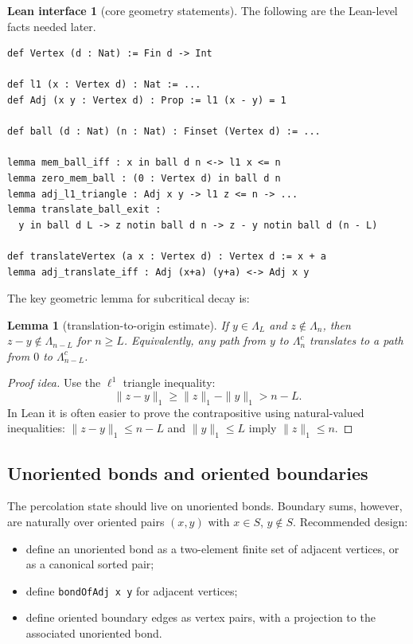 \documentclass[11pt]{article}
\newcommand{\Lam}{\Lambda}
\theoremstyle{definition}
\newtheorem{interface}[definition]{Lean interface}
\theoremstyle{plain}
\newtheorem{lemma}[definition]{Lemma}
\begin{document}
\begin{interface}[core geometry statements]
The following are the Lean-level facts needed later.
\begin{lstlisting}
def Vertex (d : Nat) := Fin d -> Int

def l1 (x : Vertex d) : Nat := ...
def Adj (x y : Vertex d) : Prop := l1 (x - y) = 1

def ball (d : Nat) (n : Nat) : Finset (Vertex d) := ...

lemma mem_ball_iff : x in ball d n <-> l1 x <= n
lemma zero_mem_ball : (0 : Vertex d) in ball d n
lemma adj_l1_triangle : Adj x y -> l1 z <= n -> ...
lemma translate_ball_exit :
  y in ball d L -> z notin ball d n -> z - y notin ball d (n - L)

def translateVertex (a x : Vertex d) : Vertex d := x + a
lemma adj_translate_iff : Adj (x+a) (y+a) <-> Adj x y
\end{lstlisting}
\end{interface}

The key geometric lemma for subcritical decay is:
\begin{lemma}[translation-to-origin estimate]
If $y\in\Lam_L$ and $z\notin\Lam_n$, then $z-y\notin\Lam_{n-L}$ for $n\ge L$.  Equivalently, any path from $y$ to $\Lam_n^c$ translates to a path from $0$ to $\Lam_{n-L}^c$.
\end{lemma}
\begin{proof}[Proof idea]
Use the $\ell^1$ triangle inequality:
\[
  \|z-y\|_1 \ge \|z\|_1-\|y\|_1 > n-L.
\]
In Lean it is often easier to prove the contrapositive using natural-valued inequalities:
$\|z-y\|_1\le n-L$ and $\|y\|_1\le L$ imply $\|z\|_1\le n$.
\end{proof}

\subsection{Unoriented bonds and oriented boundaries}

The percolation state should live on unoriented bonds.  Boundary sums, however, are naturally over oriented pairs $(x,y)$ with $x\in S$, $y\notin S$.  Recommended design:
\begin{itemize}[leftmargin=1.4em]
  \item define an unoriented bond as a two-element finite set of adjacent vertices, or as a canonical sorted pair;
  \item define \texttt{bondOfAdj x y} for adjacent vertices;
  \item define oriented boundary edges as vertex pairs, with a projection to the associated unoriented bond.
\end{itemize}
\end{document}
